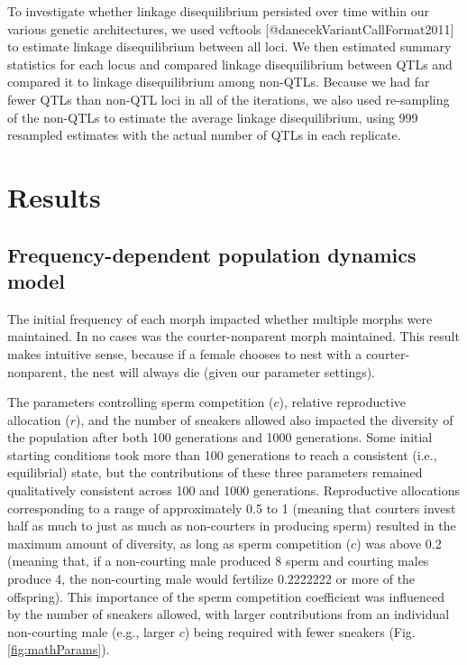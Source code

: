 \documentclass[
  11pt,
]{article}
\begin{document}
To investigate whether linkage disequilibrium persisted over time within our various genetic architectures, we used vcftools {[}@danecekVariantCallFormat2011{]} to estimate linkage disequilibrium between all loci. We then estimated summary statistics for each locus and compared linkage disequilibrium between QTLs and compared it to linkage disequilibrium among non-QTLs. Because we had far fewer QTLs than non-QTL loci in all of the iterations, we also used re-sampling of the non-QTLs to estimate the average linkage disequilibrium, using 999 resampled estimates with the actual number of QTLs in each replicate.

\hypertarget{results}{%
\section{Results}\label{results}}

\hypertarget{frequency-dependent-population-dynamics-model}{%
\subsection{Frequency-dependent population dynamics model}\label{frequency-dependent-population-dynamics-model}}

The initial frequency of each morph impacted whether multiple morphs
were maintained. In no cases was the courter-nonparent morph maintained.
This result makes intuitive sense, because if a female chooses to nest
with a courter-nonparent, the nest will always die (given our parameter
settings).

The parameters controlling sperm competition (\(c\)), relative
reproductive allocation (\(r\)), and the number of sneakers allowed also
impacted the diversity of the population after both 100 generations and
1000 generations. Some initial starting conditions took more than 100
generations to reach a consistent (i.e., equilibrial) state, but the
contributions of these three parameters remained qualitatively
consistent across 100 and 1000 generations. Reproductive allocations
corresponding to a range of approximately 0.5 to 1 (meaning that
courters invest half as much to just as much as non-courters in
producing sperm) resulted in the maximum amount of diversity, as long as
sperm competition (\(c\)) was above 0.2 (meaning that, if a non-courting
male produced 8 sperm and courting males produce 4, the non-courting
male would fertilize 0.2222222 or more of the
offspring). This importance of the sperm competition coefficient was
influenced by the number of sneakers allowed, with larger contributions
from an individual non-courting male (e.g., larger \(c\)) being required
with fewer sneakers (Fig. \ref{fig:mathParams}).
\end{document}
